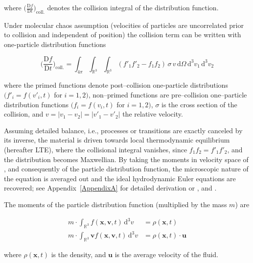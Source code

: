 where $\big(\frac{\mathrm{D}f}{\mathrm{D}t}\big)_{\text{coll.}}$ denotes the collision integral of the distribution function.

Under molecular chaos assumption (velocities of particles are uncorrelated prior to collision and independent of position) the collision term can be written with one-particle distribution functions

\begin{equation}
  \Big(\frac{\mathrm{D}f}{\mathrm{D}t}\Big)_{\text{coll.}} = \int_{4\pi}\int_{\mathbb{R}^{3}}\int_{\mathbb{R}^{3}} (f'_{1}f'_{2} - f_{1}f_{2})\, \sigma\, v\, \mathrm{d}\Omega\, \mathrm{d}^{3}v_{1}\, \mathrm{d}^{3}v_{2}
\label{eq:collisionInt}
\end{equation}

where the primed functions denote post--collision one-particle distributions $(f'_{i}=f(v'_{i},t) $ for $ i = 1,2)$, non--primed functions are pre--collision one--particle distribution functions $(f_{i}=f(v_{i},t) $ for $ i = 1,2)$, $\sigma$ is the cross section of the collision, and $v = \lvert v_{1}-v_{2} \rvert = \lvert v'_{1}-v'_{2} \rvert$ the relative velocity.

Assuming detailed balance, i.e., processes or transitions are exactly canceled by its inverse, the material is driven towards local thermodynamic equilibrium (hereafter LTE), where the collisional integral vanishes, since $f_{1}f_{2} = f'_{1}f'_{2}$, and the distribution becomes Maxwellian.
By taking the moments in velocity space of , and consequently of the particle distribution function, the microscopic nature of the equation is averaged out and the ideal hydrodynamic Euler equations are recovered; see Appendix~\ref{AppendixA} for detailed derivation or \citet{Mihalas}, and \citet{Shu_2}.

The moments of the particle distribution function (multiplied by the mass $m$) are

\begin{align}
  m\cdot \int_{\mathbb{R}^{3}} f(\textbf{x}, \textbf{v}, t)\,\mathrm{d}^{3}v &= \rho(\textbf{x},t) \label{eq:fmoment1} \\
  m\cdot \int_{\mathbb{R}^{3}} \textbf{v} f(\textbf{x}, \textbf{v}, t)\,\mathrm{d}^{3}v &= \rho(\textbf{x},t) \cdot \textbf{u} \label{eq:fmoment2}
\end{align}

where $\rho(\textbf{x},t)$ is the density, and $\textbf{u}$ is the average velocity of the fluid.

